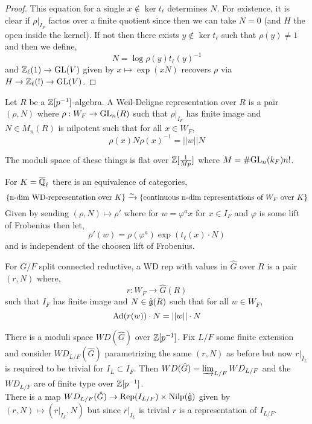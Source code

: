 \documentclass[12pt]{article}
\begin{document}
\begin{proof}
This equation for a single $x \notin \ker{t_\ell}$ determines $N$. For existence, it is clear if $\rho|_{I_F}$ factos over a finite quotient since then we can take $N = 0$ (and $H$ the open inside the kernel). If not then there exists $y \notin \ker{t_\ell}$ such that $\rho(y) \neq 1$ and then we define,
\[ N = \log{\rho(y) t_\ell(y)^{-1}} \]
and $\mathbb{Z}_\ell(1) \to \mathrm{GL}(V)$ given by $x \mapsto \exp(xN)$ recovers $\rho$ via $H \to \mathbb{Z}_\ell(!) \to \mathrm{GL}(V)$.
\end{proof}

\begin{defn}
Let $R$ be a $\mathbb{Z}[p^{-1}]$-algebra. A Weil-Deligne representation over $R$ is a pair $(\rho, N)$ where $\rho : W_F \to \mathrm{GL}_n(R)$ such that $\rho|_{I_F}$ has finite image and $N \in M_n(R)$ is nilpotent such that for all $x \in W_F$,
\[ \rho(x) N \rho(x)^{-1}  = || w || N \] 
\end{defn}

\begin{rmk}
The moduli space of these things is flat over $\mathbb{Z}[\frac{1}{M p}]$ where $M = \# \mathrm{GL}_n(k_F) n!$. 
\end{rmk}

\begin{thm}
For $K = \overline{\mathbb{Q}}_\ell$ there is an equivalence of categories,
\[ \{ \text{n-dim WD-representation over } K \} \xrightarrow{\sim} \{ \text{continuous n-dim representations of } W_F\text{ over } K \} \]
Given by sending $(\rho, N) \mapsto \rho'$ where for $w = \varphi^a x$ for $x \in I_F$ and $\varphi$ is some lift of Frobenius then let,
\[ \rho'(w) = \rho(\varphi^a) \exp{(t_\ell(x) \cdot N)} \]
and is independent of the choosen lift of Frobenius. 
\end{thm}

\begin{defn}
For $G/F$ split connected reductive, a WD rep with values in $\hat{G}$ over $R$ is a pair $(r, N)$ where,
\[ r : W_F \to \hat{G}(R) \]
such that $I_F$ has finite image and $N \in \hat{\mathfrak{g}}(R)$ such that for all $w \in W_F$,
\[ \mathrm{Ad}(r(w)) \cdot N = ||w|| \cdot N \]
\end{defn}

\begin{rmk}
There is a moduli space $WD(\hat{G})$ over $\mathbb{Z}[p^{-1}]$. Fix $L / F$ some finite extension and consider $WD_{L/F}(\hat{G})$ parametrizing the same $(r, N)$ as before but now $r|_{I_L}$ is required to be trivial for $I_L \subset I_F$. Then $WD(\hat{G}) = \varinjlim_{L/F} WD_{L/F}$ and the $WD_{L/F}$ are of finite type over $\mathbb{Z}[p^{-1}]$. 
\bigskip\\
There is a map $WD_{L/F}(\hat{G}) \to \mathrm{Rep}(I_{L/F}) \times \mathrm{Nilp}(\hat{\mathfrak{g}})$ given by $(r,N) \mapsto (r|_{I_F}, N)$ but since $r|_{I_L}$ is trivial $r$ is a representation of $I_{L/F}$.
\end{rmk}
\end{document}
